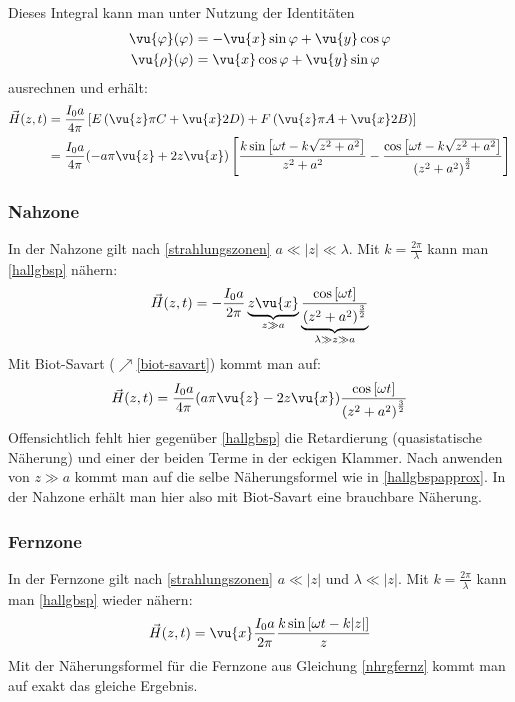 Dieses Integral kann man unter Nutzung der Identitäten
\begin{equation*}
	\begin{split}
	\vu{\varphi}(\varphi)&=-\vu{x}\sin\varphi+\vu{y}\cos\varphi\\
	\vu{\rho}(\varphi)&=\vu{x}\cos\varphi+\vu{y}\sin\varphi	
	\end{split}
\end{equation*}
ausrechnen und erhält:
\begin{equation}\label{hallgbsp}\begin{split}
		\vec{{H}}(z, {t})&=\frac{I_{0} a}{4 \pi}\left[E\left(\vu{z}\pi C+\vu{x}2D\right)+F\left(\vu{z}\pi A+\vu{x}2B\right)\right]\\
		&=\frac{I_{0} a}{4 \pi}(-a\pi\vu{z}+2z\vu{x})\left[\frac{k\sin\left[\omega {t}-k\sqrt{z^2+a^2}\right]}{z^2+a^2}-\frac{\cos\left[\omega {t}-k\sqrt{z^2+a^2}\right]}{\left(z^2+a^2\right)^{\frac{3}{2}}}\right]
\end{split}\end{equation}
\subsubsection{Nahzone}
In der Nahzone gilt nach \ref{strahlungszonen} $a\ll |z|\ll\lambda$. Mit $k=\frac{2\pi}{\lambda}$ kann man \ref{hallgbsp} nähern:
\begin{equation}\label{hallgbspapprox}\begin{split}
	\vec{{H}}(z, {t})=-\frac{I_{0} a}{2 \pi}\underbrace{z\vu{x}}_{z\gg a}\underbrace{\frac{\cos\left[\omega {t}\right]}{\left(z^2+a^2\right)^{\frac{3}{2}}}}_{\lambda\gg z \gg a}
\end{split}\end{equation}
Mit Biot-Savart ($\nearrow$\ref{biot-savart}) kommt man auf:
\begin{equation}
	\vec{{H}}(z, {t})=\frac{I_{0} a}{4 \pi}(a\pi\vu{z}-2z\vu{x})\frac{\cos\left[\omega {t}\right]}{\left(z^2+a^2\right)^{\frac{3}{2}}}
\end{equation}
Offensichtlich fehlt hier gegenüber \ref{hallgbsp} die Retardierung (quasistatische Näherung) und einer der beiden Terme in der eckigen Klammer. Nach anwenden von $z\gg a$ kommt man auf die selbe Näherungsformel wie in \ref{hallgbspapprox}. In der Nahzone erhält man hier also mit Biot-Savart eine brauchbare Näherung.
\subsubsection{Fernzone}
In der Fernzone gilt nach \ref{strahlungszonen} $a\ll |z|$ und $\lambda\ll |z|$. Mit $k=\frac{2\pi}{\lambda}$ kann man \ref{hallgbsp} wieder nähern:
\begin{equation}
	\begin{split}
		\vec{{H}}(z, {t})=\vu{x} \frac{I_{0} a}{2 \pi}\frac{k\sin\left[\omega {t}-k|z|\right]}{z}
	\end{split}
\end{equation}
Mit der Näherungsformel für die Fernzone aus Gleichung \ref{nhrgfernz} kommt man auf exakt das gleiche Ergebnis.
